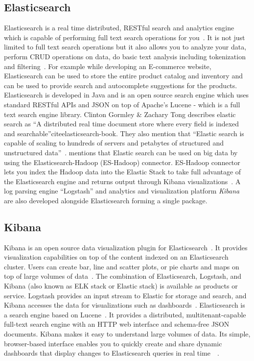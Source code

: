     \pv
	
\subsection{Elasticsearch}

Elasticsearch is a real time distributed, RESTful search and analytics
engine which is capable of performing full text search operations for
you~\cite{www-elasticsearch}.  It is not just limited to full text
search operations but it also allows you to analyze your data, perform
CRUD operations on data, do basic text analysis including tokenization
and filtering~\cite{www-elasticsearch-intro}. For example while
developing an E-commerce website, Elasticsearch can be used to store
the entire product catalog and inventory and can be used to provide
search and autocomplete suggestions for the products. Elasticsearch is
developed in Java and is an open source search engine which uses
standard RESTful APIs and JSON on top of Apache's Lucene - which is a
full text search engine library. Clinton Gormley \& Zachary Tong
describes elastic search as ``A distributed real time document store
where every field is indexed and
searchable''cite{elasticsearch-book}. They also mention that ``Elastic
search is capable of scaling to hundreds of servers and petabytes of
structured and unstructured
data''~\cite{www-elasticsearch-hadoop}. mentions that Elastic search
can be used on big data by using the Elasticsearch-Hadoop (ES-Hadoop)
connector. ES-Hadoop connector lets you index the Hadoop data into the
Elastic Stack to take full advantage of the Elasticsearch engine and
returns output through Kibana
visualizations~\cite{www-wikipedia-elasticsearch}. A log parsing
engine ``Logstash'' and analytics and visualization platform \textit{Kibana}
are also developed alongside Elasticsearch forming a single package.

    \pv
    
\subsection{Kibana}

Kibana is an open source data visualization plugin for
Elasticsearch~\cite{www-kibana-1}. It provides visualization
capabilities on top of the content indexed on an Elasticsearch
cluster. Users can create bar, line and scatter plots, or pie charts
and maps on top of large volumes of data~\cite{www-kibana-2}. The
combination of Elasticsearch, Logstash, and Kibana (also known as ELK
stack or Elastic stack) is available as products or service. Logstash
provides an input stream to Elastic for storage and search, and Kibana
accesses the data for visualizations such as
dashboards~\cite{www-kibana-3}.  Elasticsearch is a search engine
based on Lucene~\cite{www-kibana-4}. It provides a distributed,
multitenant-capable full-text search engine with an HTTP web interface
and schema-free JSON documents. Kibana makes it easy to understand
large volumes of data. Its simple, browser-based interface enables you
to quickly create and share dynamic dashboards that display changes to
Elasticsearch queries in real
time~\cite{www-kibana-5}~\cite{www-kibana-6}.

